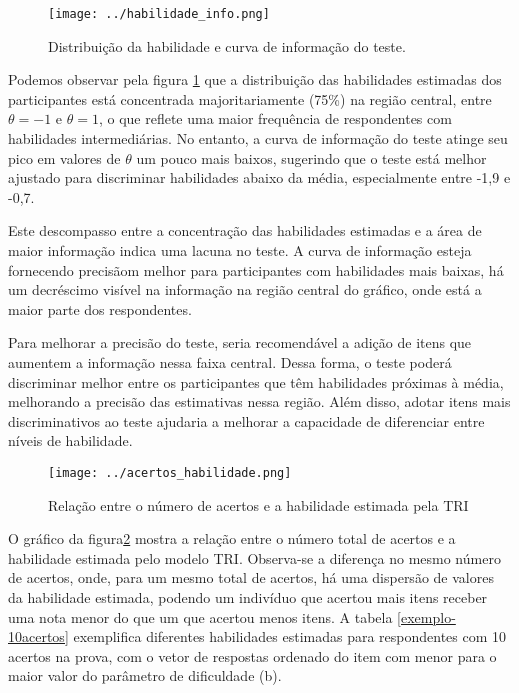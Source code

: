 \begin{figure}[H]
	\centering
	\caption{Distribuição da habilidade e curva de informação do teste.}
	\texttt{[image: ../habilidade\_info.png]}
		\parbox{\textwidth}{
		\centering %
	}
	\label{fig:info_habilidade}
\end{figure}

Podemos observar pela figura \ref{fig:info_habilidade} que a distribuição das habilidades estimadas dos participantes está concentrada majoritariamente (75\%) na região central, entre $\theta = -1$ e $\theta = 1$, o que reflete uma maior frequência de respondentes com habilidades intermediárias. No entanto, a curva de informação do teste atinge seu pico em valores de $\theta$ um pouco mais baixos, sugerindo que o teste está melhor ajustado para discriminar habilidades abaixo da média, especialmente entre -1,9 e -0,7.

Este descompasso entre a concentração das habilidades estimadas e a área de maior informação indica uma lacuna no teste. A curva de informação esteja fornecendo precisãom melhor para participantes com habilidades mais baixas, há um decréscimo visível na informação na região central do gráfico, onde está a maior parte dos respondentes. 

Para melhorar a precisão do teste, seria recomendável a adição de itens que aumentem a informação nessa faixa central. Dessa forma, o teste poderá discriminar melhor entre os participantes que têm habilidades próximas à média, melhorando a precisão das estimativas nessa região. Além disso, adotar itens mais discriminativos ao teste ajudaria a melhorar a capacidade de diferenciar entre níveis de habilidade.

\begin{figure}[!hbt]
	\centering
		\caption{Relação entre o número de acertos e a habilidade estimada pela TRI}
	\texttt{[image: ../acertos\_habilidade.png]}
	\parbox{\textwidth}{
		\centering %
	}
	\label{fig:acertos_habilidade}
\end{figure}

O gráfico da figura\ref{fig:acertos_habilidade} mostra a relação entre o número total de acertos e a habilidade estimada pelo modelo TRI. Observa-se a diferença no mesmo número de acertos, onde, para um mesmo total de acertos, há uma dispersão de valores da habilidade estimada, podendo um indivíduo que acertou mais itens receber uma nota menor do que um que acertou menos itens. A tabela \ref{exemplo-10acertos} exemplifica diferentes habilidades estimadas para respondentes com 10 acertos na prova, com o vetor de respostas ordenado do item com menor para o maior valor do parâmetro de dificuldade (b).


